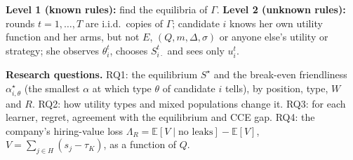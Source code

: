 \documentclass[10pt]{article}
\theoremstyle{plain}
\theoremstyle{definition}\newtheorem{definition}{Definition}
\newcommand{\E}{\mathbb{E}}\newcommand{\1}{\mathbf{1}}
\begin{document}
\textbf{Level 1 (known rules):} find the equilibria of $\Gamma$. \textbf{Level 2 (unknown rules):} rounds $t=1,\dots,T$ are i.i.d.\ copies
of $\Gamma$; candidate $i$ knows her own utility function and her arms, but not $E$, $(Q,m,\Delta,\sigma)$ or anyone else's utility or
strategy; she observes $\theta_i^t$, chooses $S_{i\cdot}^t$ and sees only $u_i^t$.

\textbf{Research questions.} RQ1: the equilibrium $S^\star$ and the break-even friendliness $\alpha^\star_{i,\theta}$ (the smallest
$\alpha$ at which type $\theta$ of candidate $i$ tells), by position, type, $W$ and $R$. RQ2: how utility types and mixed
populations change it. RQ3: for each learner, regret, agreement with the equilibrium and CCE gap.
RQ4: the company's hiring-value loss $\Lambda_R=\E[V\mid\text{no leaks}]-\E[V]$, $V=\sum_{j\in H}(s_j-\tau_K)$, as a function of $Q$.
\end{document}
